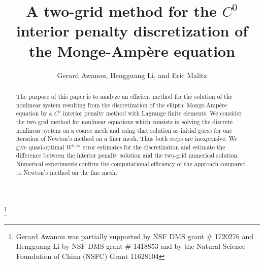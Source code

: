 \documentclass[12pt]{amsart}
\numberwithin{equation}{section}
\begin{document}
\title[]{
A two-grid method for the $C^0$
interior penalty discretization of the Monge-Amp\`{e}re equation
}



\thanks{Gerard Awanou was partially supported by NSF DMS grant \# 1720276 and Hengguang Li by NSF DMS grant \# 1418853 and by the Natural Science Foundation of China (NSFC) Grant 11628104}


\author{Gerard Awanou, Hengguang Li, and Eric Malitz}

\address{Department of Mathematics, Statistics, and Computer Science, M/C 249.
University of Illinois at Chicago, 
Chicago, IL 60607-7045, USA}

\address{Department of Mathematics,
Wayne State University,
656 W. Kirby, Detroit, MI 48202, USA}

\address{Department of Mathematics, Statistics, and Computer Science, M/C 249.
University of Illinois at Chicago, 
Chicago, IL 60607-7045, USA}
 


\maketitle

\begin{abstract}
The purpose of this paper is to analyze an efficient method for the solution of the nonlinear system resulting from the discretization of the elliptic 
Monge-Amp\`ere equation by a $C^0$ interior penalty method with Lagrange finite elements. We consider the two-grid method for nonlinear equations which consists in solving the discrete nonlinear system on a coarse mesh and using that solution as initial guess for one iteration of Newton's method on a finer mesh. Thus both steps are inexpensive. We give quasi-optimal $W^{1,\infty}$ error estimates for the discretization and estimate the difference between the interior penalty solution and the two-grid numerical solution. Numerical experiments confirm the computational efficiency of the approach compared to Newton's method on the fine mesh.
\end{abstract}
\end{document}
